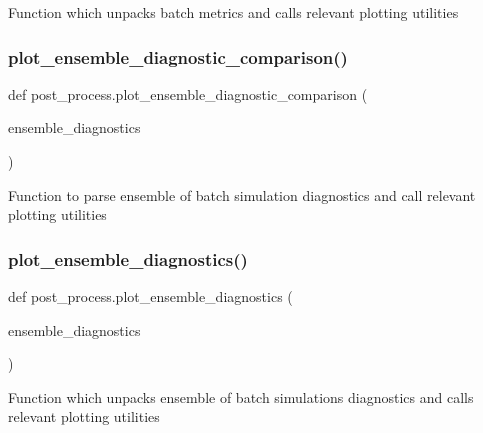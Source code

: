 \begin{DoxyVerb}Function which unpacks batch metrics and calls relevant plotting utilities
\end{DoxyVerb}
 \mbox{\label{namespacepost__process_ac6e21bb76233fe218be2b64d33122a0b}} 
\subsubsection{\texorpdfstring{plot\_ensemble\_diagnostic\_comparison()}{plot\_ensemble\_diagnostic\_comparison()}}
{\footnotesize\ttfamily def post\+\_\+process.\+plot\+\_\+ensemble\+\_\+diagnostic\+\_\+comparison (\begin{DoxyParamCaption}\item[{}]{ensemble\+\_\+diagnostics }\end{DoxyParamCaption})}

\begin{DoxyVerb}Function to parse ensemble of batch simulation diagnostics and call relevant plotting utilities
\end{DoxyVerb}
 \mbox{\label{namespacepost__process_a32f70cf0b6377a438888111e013d4ca2}} 
\subsubsection{\texorpdfstring{plot\_ensemble\_diagnostics()}{plot\_ensemble\_diagnostics()}}
{\footnotesize\ttfamily def post\+\_\+process.\+plot\+\_\+ensemble\+\_\+diagnostics (\begin{DoxyParamCaption}\item[{}]{ensemble\+\_\+diagnostics }\end{DoxyParamCaption})}

\begin{DoxyVerb}Function which unpacks ensemble of batch simulations diagnostics and calls relevant plotting utilities
\end{DoxyVerb}
 \mbox{\label{namespacepost__process_a37ffa7064da3200fff3a6dda3a5787d5}} 
